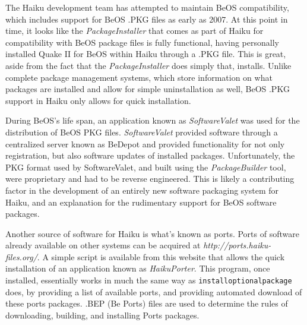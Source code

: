 \documentclass{article}
\begin{document}
The Haiku development team has attempted to maintain BeOS
compatibility, which includes support for BeOS .PKG files as early as
2007.\cite{OpeningPkgFiles} At this point in time, it looks like
the \textit{PackageInstaller} that comes as part of Haiku for
compatibility with BeOS package files is fully functional, having
personally installed Quake II for BeOS within Haiku through a .PKG
file. This is great, aside from the fact that
the \textit{PackageInstaller} does simply that, installs. Unlike
complete package management systems, which store information on what
packages are installed and allow for simple uninstallation as well,
BeOS .PKG support in Haiku only allows for quick installation.

During BeOS's life span, an application known
as \textit{SoftwareValet} was used for the distribution of BeOS PKG
files. \textit{SoftwareValet} provided software through a centralized
server known as BeDepot\cite{SoftwareValet} and provided functionality
for not only registration, but also software updates of installed
packages. Unfortunately, the PKG format used by SoftwareValet, and
built using the \textit{PackageBuilder} tool, were proprietary and had
to be reverse engineered.\cite{OpeningPkgFiles} This is likely a
contributing factor in the development of an entirely new software
packaging system for Haiku, and an explanation for the rudimentary
support for BeOS software packages.

Another source of software for Haiku is what's known as ports. Ports
of software already available on other systems can be acquired
at \textit{http://ports.haiku-files.org/}. A simple script is
available from this website that allows the quick installation of an
application known as \textit{HaikuPorter}. This program, once
installed, essentially works in much the same way
as \texttt{installoptionalpackage} does, by providing a list of
available ports, and providing automated download of these ports
packages. .BEP (Be Ports) files are used to determine the rules of
downloading, building, and installing Ports packages.\cite{BepFiles}
\end{document}
